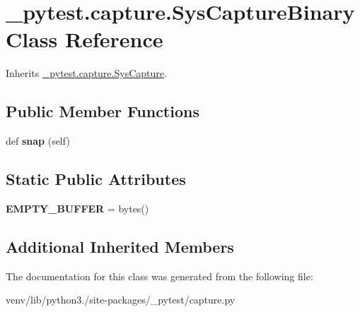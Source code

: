 \hypertarget{class__pytest_1_1capture_1_1_sys_capture_binary}{}\section{\+\_\+pytest.\+capture.\+Sys\+Capture\+Binary Class Reference}
\label{class__pytest_1_1capture_1_1_sys_capture_binary}


Inherits \hyperlink{class__pytest_1_1capture_1_1_sys_capture}{\+\_\+pytest.\+capture.\+Sys\+Capture}.

\subsection*{Public Member Functions}
\begin{DoxyCompactItemize}
\item 
\mbox{\label{class__pytest_1_1capture_1_1_sys_capture_binary_a425a6608bccca95e0626ed52fa29044f}} 
def {\bfseries snap} (self)
\end{DoxyCompactItemize}
\subsection*{Static Public Attributes}
\begin{DoxyCompactItemize}
\item 
\mbox{\label{class__pytest_1_1capture_1_1_sys_capture_binary_a5e541bb9e8e2dc2ccebad263776ea28e}} 
{\bfseries E\+M\+P\+T\+Y\+\_\+\+B\+U\+F\+F\+ER} = bytes()
\end{DoxyCompactItemize}
\subsection*{Additional Inherited Members}


The documentation for this class was generated from the following file\+:\begin{DoxyCompactItemize}
\item 
venv/lib/python3./site-\/packages/\+\_\+pytest/capture.\+py\end{DoxyCompactItemize}
